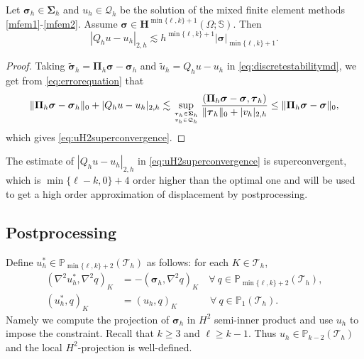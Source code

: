 \begin{theorem}
Let $\boldsymbol \sigma_h\in\boldsymbol\Sigma_h$ and $u_h\in \mathcal Q_h$ be the solution of the mixed finite element methods \eqref{mfem1}-\eqref{mfem2}. Assume $\boldsymbol \sigma\in\boldsymbol{H}^{\min\{\ell,k\}+1}(\Omega; \mathbb{S})$. Then
\begin{equation}\label{eq:uH2superconvergence}
|Q_hu-u_h|_{2,h}\lesssim h^{\min\{\ell,k\}+1}|\boldsymbol \sigma|_{\min\{\ell,k\}+1}.
\end{equation}
\end{theorem}
\begin{proof}
Taking $\widetilde{\boldsymbol{\sigma}}_h=\boldsymbol \Pi_h\boldsymbol{\sigma}-\boldsymbol{\sigma}_h$ and $\widetilde{u}_h=Q_hu-u_h$ in \eqref{eq:discretestabilitymd}, we get from \eqref{eq:errorequation} that
\[
\|\boldsymbol \Pi_h\boldsymbol{\sigma}-\boldsymbol{\sigma}_h\|_{0}+|Q_hu-u_h|_{2,h}\lesssim \sup_{\boldsymbol{\tau}_h\in\boldsymbol\Sigma_h\atop v_h\in\mathcal Q_h}\frac{(\boldsymbol \Pi_h\boldsymbol{\sigma}-\boldsymbol{\sigma}, \boldsymbol{\tau}_h)}{\|\boldsymbol{\tau}_h\|_{0} + |v_h|_{2,h}}\leq \|\boldsymbol \Pi_h\boldsymbol{\sigma}-\boldsymbol{\sigma}\|_0,
\]
which gives \eqref{eq:uH2superconvergence}.
\end{proof}

The estimate of $|Q_hu-u_h|_{2,h}$ in \eqref{eq:uH2superconvergence} is superconvergent, which is  $\min\{\ell-k,0\}+4$ order higher than the optimal one and will be used to get a high order approximation of displacement by postprocessing.

\subsection{Postprocessing}
Define $u_h^{\ast}\in \mathbb P_{\min\{\ell,k\}+2}(\mathcal T_h)$ as follows: for each $K\in\mathcal T_h$,
\begin{align*}
(\nabla^2u_h^{\ast}, \nabla^2 q)_K&=-(\boldsymbol \sigma_h, \nabla^2 q)_K\quad\forall~q\in\mathbb P_{\min\{\ell,k\}+2}(\mathcal T_h),
\\
(u_h^{\ast}, q)_K&=(u_h, q)_K\qquad\quad\;\forall~q\in\mathbb P_{1}(\mathcal T_h).
\end{align*}
Namely we compute the projection of $\boldsymbol  \sigma_h$ in $H^2$ semi-inner product and use $u_h$ to impose the constraint. Recall that $k\geq 3$ and $\ell\geq k-1$. Thus $u_h\in \mathbb P_{k-2}(\mathcal T_h)$ and the local $H^2$-projection is well-defined.

